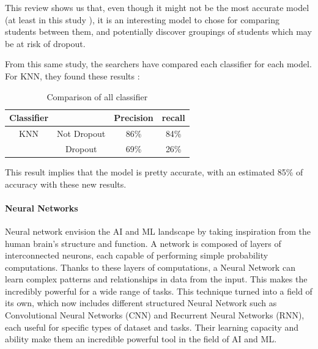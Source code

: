 \documentclass[conference]{IEEEtran}
\begin{document}
This review shows us that, even though it  might not be the most accurate model (at least in this study \cite{shiful_machine_2021}), it is an interesting model to chose for comparing students between them, and potentially discover groupings of students which may be at risk of dropout.

From this same study, the searchers have compared each classifier for each model. For KNN, they found these results :
\begin{table}[H]
    \centering
    \caption{Comparison of all classifier\cite{shiful_machine_2021}}
    \begin{tabular}{|c|c|c|c|}
        \hline
        \textbf{Classifier} & & \textbf{Precision} & \textbf{recall}\\
        \hline
        KNN & Not Dropout & 86\% & 84\% \\
        \cline{2-4} 
        & Dropout & 69\% & 26\% \\
        \hline
    \end{tabular}
    \label{tab:compar_classifier_shiful}
\end{table}

This result implies that the model is pretty accurate, with an estimated 85\% of accuracy with these new results.

\vspace{8pt}
\paragraph{Neural Networks}
Neural network envision the AI and ML landscape by taking inspiration from the human brain's structure and function. A network is composed of layers of interconnected neurons, each capable of performing simple probability computations. Thanks to these layers of computations, a Neural Network can learn complex patterns and relationships in data from the input. This makes the incredibly powerful for a wide range of tasks. 
This technique turned into a field of its own, which now includes different structured Neural Network such as Convolutional Neural Networks (CNN) and Recurrent Neural Networks (RNN), each useful for specific types of dataset and tasks. Their learning capacity and ability make them an incredible powerful tool in the field of AI and ML. 
\end{document}
